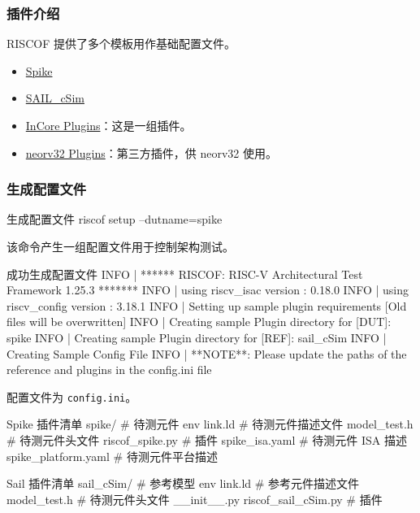 \documentclass[xcolor=table,dvipsnames,svgnames,aspectratio=169]{ctexbeamer}
\begin{document}
\begin{frame}
  \frametitle{插件介绍}

  RISCOF 提供了多个模板用作基础配置文件。

  \begin{itemize}
    \item \href{https://gitlab.com/incoresemi/riscof-plugins/-/tree/master/spike_parallel}{Spike}
    \item \href{https://gitlab.com/incoresemi/riscof-plugins/-/blob/master/sail_cSim/}{SAIL\_cSim}
    \item \href{https://gitlab.com/incoresemi/riscof-plugins}{InCore Plugins}：这是一组插件。
    \item \href{https://github.com/stnolting/neorv32-riscof}{neorv32 Plugins}：第三方插件，供 neorv32 使用。
  \end{itemize}


\end{frame}

\begin{frame}
  \frametitle{生成配置文件}

  \begin{codeblock}[language=bash]{生成配置文件}
riscof setup --dutname=spike
  \end{codeblock}

  该命令产生一组配置文件用于控制架构测试。

  \begin{codeblock}[language=bash]{成功生成配置文件}
INFO | ****** RISCOF: RISC-V Architectural Test Framework 1.25.3 *******
INFO | using riscv_isac version : 0.18.0
INFO | using riscv_config version : 3.18.1
INFO | Setting up sample plugin requirements [Old files will be overwritten]
INFO | Creating sample Plugin directory for [DUT]: spike
INFO | Creating sample Plugin directory for [REF]: sail_cSim
INFO | Creating Sample Config File
INFO | **NOTE**: Please update the paths of the reference and plugins in the config.ini file
  \end{codeblock}

  \newpage

  配置文件为 \lstinline|config.ini|。

  \begin{codeblock}{Spike 插件清单}
spike/ # 待测元件
  env
    link.ld # 待测元件描述文件
    model_test.h # 待测元件头文件
  riscof_spike.py # 插件
  spike_isa.yaml # 待测元件 ISA 描述
  spike_platform.yaml # 待测元件平台描述
  \end{codeblock}
  \begin{codeblock}{Sail 插件清单}
sail_cSim/ # 参考模型
  env
    link.ld # 参考元件描述文件
    model_test.h # 待测元件头文件
  __init__.py
  riscof_sail_cSim.py # 插件
      \end{codeblock}
\end{frame}
\end{document}

